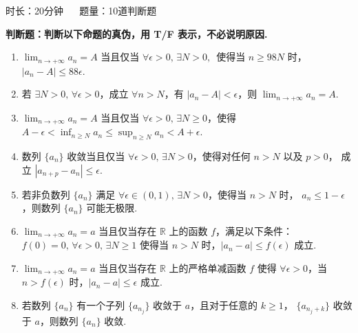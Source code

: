 \newenvironment{solution}{\begin{proofc}[解答]}{\end{proofc}}

时长：20分钟 $\quad$ 题量：10道判断题

\textbf{判断题：判断以下命题的真伪，用 T/F 表示，不必说明原因.}
\begin{enumerate}
    \item[1.]$\displaystyle \lim_{n\to+\infty}a_n=A$ 当且仅当 $\forall \epsilon>0,\,\exists N>0,\,$ 
    使得当 $n\geq 98N$ 时，$\left| a_n-A \right|\leq 88\epsilon$.
    
    \item[2.]若 $\exists N>0,\,\forall \epsilon>0$，成立 $\forall n>N$，有 $\left|a_n-A\right|<\epsilon$，则
    $\displaystyle \lim_{n\to+\infty}a_n=A$.

    \item[3.]$\displaystyle \lim_{n\to+\infty}a_n=A$ 当且仅当 $\forall \epsilon>0,\,\exists N\geq 0$，使得 
    $\displaystyle A-\epsilon<\inf_{n\geq N}a_n\leq \sup_{n\geq N}a_n<A+\epsilon$.

    \item[4.]数列 $\{a_n\}$ 收敛当且仅当 $\forall\epsilon>0,\,\exists N>0$，使得对任何 $n>N$ 以及 $p>0$，
    成立 $\left| a_{n+p}-a_n \right|\leq \epsilon$.
    
    \item[5.]若非负数列 $\{a_n\}$ 满足 $\forall\epsilon\in(0,1),\,\exists N>0$，使得当 $n>N$ 时，
    $a_n\leq 1-\epsilon$，则数列 $\{a_n\}$ 可能无极限.

    \item[6.]$\displaystyle \lim_{n\to+\infty}a_n=a$ 当且仅当存在 $\mathbb{R}$ 上的函数 $f$，满足以下条件：
    $f(0)=0,\,\forall\epsilon>0,\,\exists N\geq 1$ 使得当 $n>N$ 时，$\left| a_n-a \right|\leq f(\epsilon)$ 成立.

    \item[7.]$\displaystyle \lim_{n\to+\infty}a_n=a$ 当且仅当存在 $\mathbb{R}$ 上的严格单减函数 $f$ 使得
    $\forall \epsilon>0$，当 $n>f(\epsilon)$ 时，$\left| a_n-a \right|\leq \epsilon$ 成立.

    \item[8.]若数列 $\{a_n\}$ 有一个子列 $\{a_{n_j}\}$ 收敛于 $a$，且对于任意的 $k\geq 1$，
    $\{a_{n_j+k}\}$ 收敛于 $a$，则数列 $\{a_n\}$ 收敛.
    

\end{enumerate}
